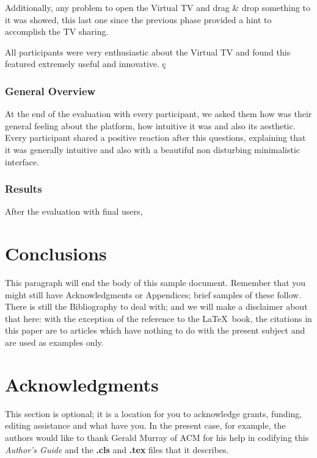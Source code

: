\documentclass{acm_proc_article-sp}
\begin{document}
Additionally, any problem to open the Virtual TV and drag \& drop something to it was showed, this last one since the previous phase provided a hint to accomplish the TV sharing.

All participants were very enthusiastic about the Virtual TV and found this featured extremely useful and innovative. ç

\subsubsection{General Overview}

At the end of the evaluation with every participant, we asked them how was their general feeling about the platform, how intuitive it was and also its aesthetic. Every participant shared a positive reaction after this questions, explaining that it was generally intuitive and also with a beautiful non disturbing minimalistic interface.  

\subsubsection{Results}
After the evaluation with final users, 
\section{Conclusions}
This paragraph will end the body of this sample document.
Remember that you might still have Acknowledgments or
Appendices; brief samples of these
follow.  There is still the Bibliography to deal with; and
we will make a disclaimer about that here: with the exception
of the reference to the \LaTeX\ book, the citations in
this paper are to articles which have nothing to
do with the present subject and are used as
examples only.

\section{Acknowledgments}
This section is optional; it is a location for you
to acknowledge grants, funding, editing assistance and
what have you.  In the present case, for example, the
authors would like to thank Gerald Murray of ACM for
his help in codifying this \textit{Author's Guide}
and the \textbf{.cls} and \textbf{.tex} files that it describes.

%

%
%
\appendix
\end{document}
